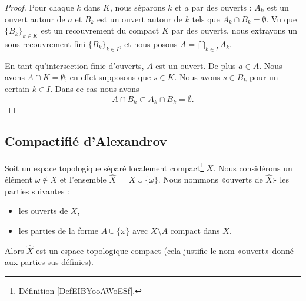 \begin{proof}
	Pour chaque \( k\) dans \( K\), nous séparons \( k\) et \( a\) par des ouverts : \( A_k\) est un ouvert autour de \( a\) et \( B_k\) est un ouvert autour de \( k\) tels que \( A_k\cap B_k=\emptyset\). Vu que \( \{ B_k \}_{k\in K}\) est un recouvrement du compact \( K\) par des ouverts, nous extrayons un sous-recouvrement fini \( \{ B_k \}_{k\in I}\), et nous posons \( A=\bigcap_{k\in I}A_{k}\).

	En tant qu'intersection finie d'ouverts, \( A\) est un ouvert. De plus \( a\in A\). Nous avons \( A\cap K=\emptyset\); en effet supposons que \( s\in K\). Nous avons \( s\in B_k\) pour un certain \( k\in I\). Dans ce cas nous avons
	\begin{equation}
		A\cap B_k\subset A_k\cap B_k=\emptyset.
	\end{equation}
\end{proof}

\subsection{Compactifié d'Alexandrov}

\begin{propositionDef}       \label{PROPooHNOZooPSzKIN}
	Soit un espace topologique séparé localement compact\footnote{Définition \ref{DefEIBYooAWoESf}.} \( X\). Nous considérons un élément \( \omega\notin X\) et l'ensemble \( \hat X =\ X\cup\{ \omega \}\). Nous nommons «ouverts de \( \hat X\)» les parties suivantes :
	\begin{itemize}
		\item les ouverts de \( X\),
		\item les parties de la forme \( A\cup\{ \omega \}\) avec \( X\setminus A\) compact dans \( X\).
	\end{itemize}
	Alors \( \hat X\) est un espace topologique compact (cela justifie le nom «ouvert» donné aux parties sus-définies).
\end{propositionDef}

